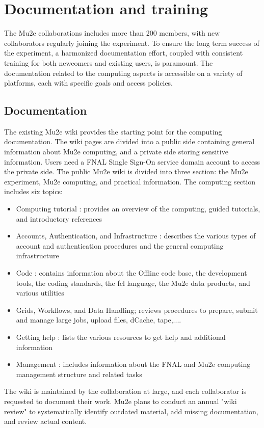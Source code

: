 
\section{Documentation and training}
\label{sec:documentation}

The Mu2e collaborations includes more than 200 members, with new collaborators regularly joining the experiment. To ensure the long term success of the experiment, a harmonized documentation effort, coupled with consistent training for both newcomers and existing users, is paramount. The documentation related to the computing aspects is accessible on a variety of platforms, each with specific goals and access policies.

\subsection{Documentation}

The existing Mu2e wiki provides the starting point for the computing documentation. The wiki pages are divided into a public side containing general information about Mu2e computing, and a private side storing sensitive information. Users need a FNAL Single Sign-On service domain account to access the private side. The public Mu2e wiki is divided into three section: the Mu2e experiment, Mu2e computing, and practical information. The computing section includes six topics:
\begin{itemize}
\item {Computing tutorial :} provides an overview of the computing, guided tutorials, and introductory references
\item {Accounts, Authentication, and Infrastructure :} describes the various types of account and authentication procedures and the general computing infrastructure
\item {Code :} contains information about the Offline code base, the development tools, the coding standards, the fcl language, the Mu2e data products, and various utilities  
\item {Grids, Workflows, and Data Handling;} reviews procedures to prepare, submit and manage large jobs, upload files, dCache, tape,....
\item {Getting help :} lists the various resources to get help and additional information
\item {Management :} includes information about the FNAL and Mu2e computing management structure and related tasks
\end{itemize}
The wiki is maintained by the collaboration at large, and each collaborator is requested to document their work. Mu2e plans to conduct an annual "wiki review" to systematically identify outdated material, add missing documentation, and review actual content. 

